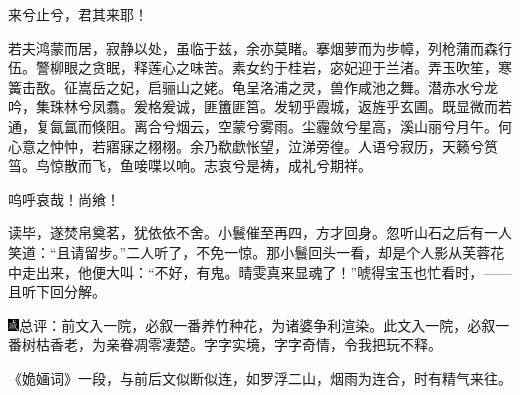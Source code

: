 来兮止兮，君其来耶！

若夫鸿蒙而居，寂静以处，虽临于兹，余亦莫睹。搴烟萝而为步幛，列枪蒲而森行伍。警柳眼之贪眠，释莲心之味苦。素女约于桂岩，宓妃迎于兰渚。弄玉吹笙，寒簧击敔。征嵩岳之妃，启骊山之姥。龟呈洛浦之灵，兽作咸池之舞。潜赤水兮龙吟，集珠林兮凤翥。爰格爰诚，匪簠匪筥。发轫乎霞城，返旌乎玄圃。既显微而若通，复氤氲而倏阻。离合兮烟云，空蒙兮雾雨。尘霾敛兮星高，溪山丽兮月午。何心意之忡忡，若寤寐之栩栩。余乃欷歔怅望，泣涕旁徨。人语兮寂历，天籁兮筼筜。鸟惊散而飞，鱼唼喋以响。志哀兮是祷，成礼兮期祥。

呜呼哀哉！尚飨！

读毕，遂焚帛奠茗，犹依依不舍。小鬟催至再四，方才回身。忽听山石之后有一人笑道：``且请留步。''二人听了，不免一惊。那小鬟回头一看，却是个人影从芙蓉花中走出来，他便大叫：``不好，有鬼。晴雯真来显魂了！''唬得宝玉也忙看时，------且听下回分解。

{\includegraphics[width=3mm]{../Images/00005}\kaishu 总评：前文入一院，必叙一番养竹种花，为诸婆争利渲染。此文入一院，必叙一番树枯香老，为亲眷凋零凄楚。字字实境，字字奇情，令我把玩不释。}

{\kaishu 《姽婳词》一段，与前后文似断似连，如罗浮二山，烟雨为连合，时有精气来往。}


